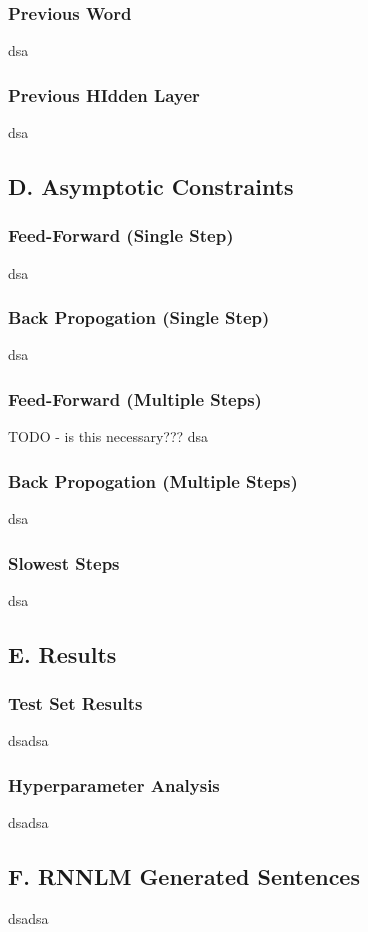 \documentclass{article}
\begin{document}
\subsubsection*{Previous Word}
dsa

\subsubsection*{Previous HIdden Layer}
dsa


\subsection*{D. Asymptotic Constraints}
\subsubsection*{Feed-Forward (Single Step)}
dsa

\subsubsection*{Back Propogation (Single Step)}
dsa

\subsubsection*{Feed-Forward (Multiple Steps)}
TODO - is this necessary??? dsa

\subsubsection*{Back Propogation (Multiple Steps)}
dsa

\subsubsection*{Slowest Steps}
dsa


\subsection*{E. Results}
\subsubsection*{Test Set Results}
dsadsa

\subsubsection*{Hyperparameter Analysis}
dsadsa


\subsection*{F. \textbf{RNNLM} Generated Sentences }
dsadsa
\end{document}
